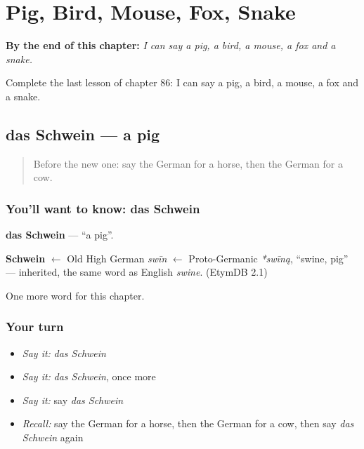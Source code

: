 
\chapter{Pig, Bird, Mouse, Fox, Snake}
\label{ch:ge-pig-bird-mouse-fox-snake}

\begin{chapteropening}
\textbf{By the end of this chapter:} \emph{I can say a pig, a bird, a mouse, a fox and a snake.}

Complete the last lesson of chapter 86: I can say a pig, a bird, a mouse, a fox and a snake.
\end{chapteropening}

\section[das Schwein]{das Schwein — a pig}

\label{lesson:GE-C86-schwein}



\begin{quote}
Before the new one: say the German for a horse, then the German for a cow.
\end{quote}

\subsection*{You'll want to know: das Schwein}
\textbf{das Schwein} — \textquotedblleft{}a pig\textquotedblright{}.

\begin{cousinweb}
\textbf{Schwein} $\leftarrow$ Old High German \emph{swīn} $\leftarrow$ Proto-Germanic \emph{*swīną}, \textquotedblleft{}swine, pig\textquotedblright{} — inherited, the same word as English \emph{swine}. (EtymDB 2.1)
\end{cousinweb}

\begin{grammarlens}[title={What you've built}]
One more word for this chapter.
\end{grammarlens}

\subsection*{Your turn}
\begin{itemize}
\raggedright
  \item \emph{Say it:} \emph{das Schwein}
  \item \emph{Say it:} \emph{das Schwein}, once more
  \item \emph{Say it:} say \emph{das Schwein}
  \item \emph{Recall:} say the German for a horse, then the German for a cow, then say \emph{das Schwein} again
\end{itemize}

